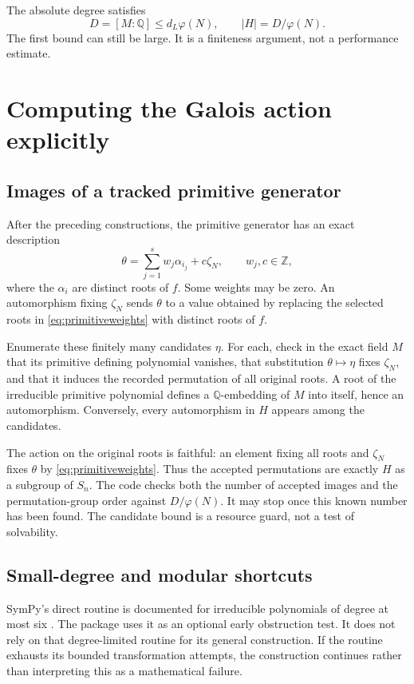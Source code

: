 \documentclass[11pt,letterpaper]{article}
\theoremstyle{definition}\newtheorem{definition}[theorem]{Definition}
\theoremstyle{remark}\newtheorem{remark}[theorem]{Remark}
\newcommand{\Q}{\mathbb Q}\newcommand{\C}{\mathbb C}\newcommand{\Z}{\mathbb Z}
\newcommand{\code}[1]{\texttt{\detokenize{#1}}}
\begin{document}
The absolute degree satisfies
\[
 D=[M:\Q]\leq d_L\varphi(N),\qquad
 |H|=D/\varphi(N).
\]
The first bound can still be large. It is a finiteness argument, not a performance estimate.

\section{Computing the Galois action explicitly}\label{sec:group}
\subsection{Images of a tracked primitive generator}
After the preceding constructions, the primitive generator has an exact description
\begin{equation}\label{eq:primitiveweights}
 \theta=\sum_{j=1}^s w_j\alpha_{i_j}+c\zeta_N,
 \qquad w_j,c\in\Z,
\end{equation}
where the $\alpha_i$ are distinct roots of $f$. Some weights may be zero. An automorphism fixing $\zeta_N$ sends $\theta$ to a value obtained by replacing the selected roots in \eqref{eq:primitiveweights} with distinct roots of $f$.

Enumerate these finitely many candidates $\eta$. For each, check in the exact field $M$ that its primitive defining polynomial vanishes, that substitution $\theta\mapsto\eta$ fixes $\zeta_N$, and that it induces the recorded permutation of all original roots. A root of the irreducible primitive polynomial defines a $\Q$-embedding of $M$ into itself, hence an automorphism. Conversely, every automorphism in $H$ appears among the candidates.

The action on the original roots is faithful: an element fixing all roots and $\zeta_N$ fixes $\theta$ by \eqref{eq:primitiveweights}. Thus the accepted permutations are exactly $H$ as a subgroup of $S_n$. The code checks both the number of accepted images and the permutation-group order against $D/\varphi(N)$. It may stop once this known number has been found. The candidate bound is a resource guard, not a test of solvability.

\subsection{Small-degree and modular shortcuts}
SymPy's direct \code{galois_group} routine is documented for irreducible polynomials of degree at most six \cite{sympynumberfields}. The package uses it as an optional early obstruction test. It does not rely on that degree-limited routine for its general construction. If the routine exhausts its bounded transformation attempts, the construction continues rather than interpreting this as a mathematical failure.
\end{document}

